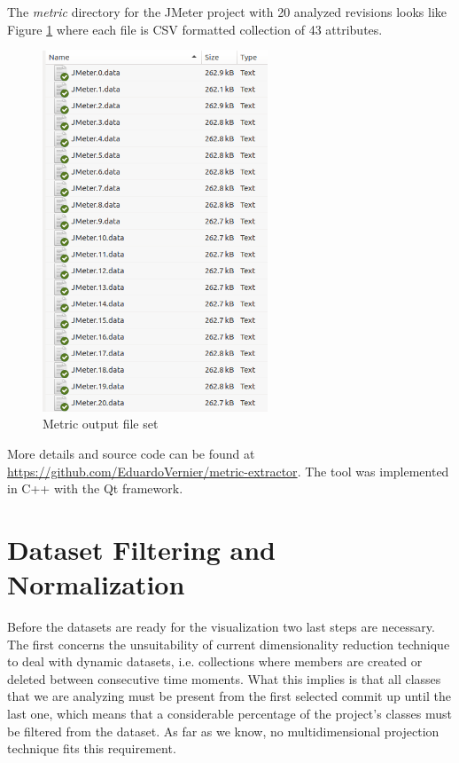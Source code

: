 The \textit{metric} directory for the JMeter project with 20 analyzed revisions looks like Figure \ref{fig:jmeter_folder} where each file is CSV formatted collection of 43 attributes.

\begin{figure}[H]
	\centering
	\includegraphics[width=0.6\textwidth]{figures/metric_dir.png}
	\caption{Metric output file set}
	\label{fig:jmeter_folder}
\end{figure}

More details and source code can be found at \url{https://github.com/EduardoVernier/metric-extractor}. The tool was implemented in C++ with the Qt framework.

\section{Dataset Filtering and Normalization} \label{sec:filtering}
Before the datasets are ready for the visualization two last steps are necessary. The first concerns the unsuitability of current dimensionality reduction technique to deal with dynamic datasets, i.e. collections where members are created or deleted between consecutive time moments. What this implies is that all classes that we are analyzing must be present from the first selected commit up until the last one, which means that a considerable percentage of the project's classes must be filtered from the dataset. As far as we know, no multidimensional projection technique fits this requirement.

